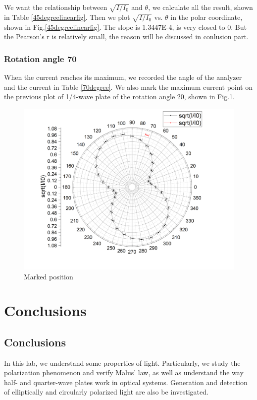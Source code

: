 \documentclass[12pt,a4paper]{article}
\begin{document}
We want the relationship between $\sqrt{I/I_0}$ and $\theta$, we calculate all the result, shown in Table \ref{45degreelinearfig}. Then we plot $\sqrt{I/I_0}$ vs. $\theta$ in the polar coordinate, shown in Fig.\ref{45degreelinearfig}. The slope is 1.3447E-4, is very closed to 0. But the Pearson's r is relatively small, the reason will be discussed in conlusion part.


\subsubsection{Rotation angle 70\degree}
When the current reaches its maximum, we recorded the angle of the analyzer and the current in Table \ref{70degree}.
We also mark the maximum current point on the previous plot of 1/4-wave plate of the rotation angle 20\degree, shown in Fig.\ref{70degreefig}.
\begin{figure}[H]
    \centering
    \includegraphics[width=12cm]{70degree.png}
    \caption{Marked position}
    \label{70degreefig}
\end{figure}

\section{Conclusions}
\subsection{Conclusions}
In this lab, we understand some properties of light. Particularly, we study the polarization phenomenon and verify Malus' law, as well as understand the way half- and quarter-wave plates work in optical systems. Generation and detection of elliptically and circularly polarized light are also be investigated.
\end{document}
